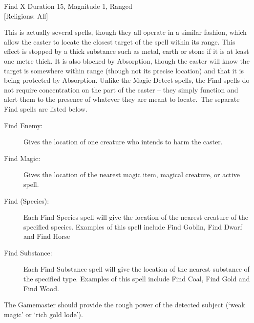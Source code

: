 \begin{rpg-spell}
{Find X}
{Duration 15, Magnitude 1, Ranged\\{[Religions: All]}}

This is actually several spells, though they all operate in a similar fashion, which allow the caster to locate the closest target of the spell within its range. This effect is stopped by a thick substance such as metal, earth or stone if it is at least one metre thick. It is also blocked by Absorption, though the caster will know the target is somewhere within range (though not its precise location) and that it is being protected by Absorption. Unlike the Magic Detect spells, the Find spells do not require concentration on the part of the caster – they simply function and alert them to the presence of whatever they are meant to locate. The separate Find spells are listed below. 
\begin{description}
\item[Find Enemy:] Gives the location of one creature who intends to harm the caster. 
\item[Find Magic:] Gives the location of the nearest magic item, magical creature, or active spell. 
\item[Find (Species):] Each Find Species spell will give the location of the nearest creature of the specified species. Examples of this spell include Find Goblin, Find Dwarf and Find Horse
\item[Find Substance:] Each Find Substance spell will give the location of the nearest substance of the specified type. Examples of this spell include Find Coal, Find Gold and Find Wood. 
\end{description}
The Gamemaster should provide the rough power of the detected subject (‘weak magic’ or ‘rich gold lode’). 
\end{rpg-spell}


